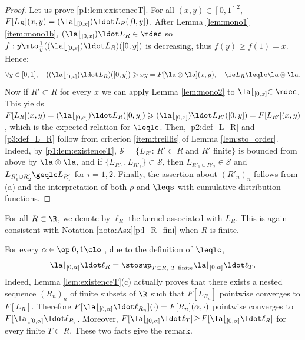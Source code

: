 \begin{proof} Let us prove \eqref{p1:lem:existenceT}. For all $(x,y)\in[0,1]^2$, $F[L_R](x,y)=(\la\lfloor_{[0,x]})\ldot L_R([0,y])$. After Lemma \ref{lem:mono1}\eqref{item:mono1b}, $(\la\lfloor_{[0,x]})\ldot L_R\in\mdec$ so $f:y\mto\frac1y((\la\lfloor_{[0,x]})\ldot L_R)([0,y])$ is decreasing, thus $f(y)\geq f(1)=x$. Hence:
\[
\forall y\in[0,1],\quad ((\la\lfloor_{[0,x]})\ldot L_R)([0,y])\geqslant xy=F[\la\otimes\la](x,y),\quad \text{\ie} L_R\leqlc \la\otimes\la.
\]
Now if $R'\subset R$ for every $x$ we can apply Lemma \ref{lem:mono2} to $\la\lfloor_{[0,x]}\in\mdec$. This yields $F[L_{R}](x,y)=(\la\lfloor_{[0,x]})\ldot L_{R}([0,y])\geqslant(\la\lfloor_{[0,x]})\ldot L_{R'}([0,y])=F[L_{R'}](x,y)$, which is the expected relation for $\leqlc$. Then, \eqref{p2:def_L_R} and \eqref{p3:def_L_R} follow from criterion \eqref{item:treillis} of Lemma \ref{lem:sto_order}. Indeed, by \eqref{p1:lem:existenceT}, $\mathcal{S}=\{L_{R'}:\,R'\subset R$ and $R'$ finite$\}$ is bounded from above by $\la\otimes\la$, and if $\{L_{R'_1},L_{R'_2}\}\subset\mathcal{S}$, then $L_{R'_1\cup R'_2}\in\mathcal{S}$ and $L_{R'_1\cup R'_2}\geqlc L_{R'_i}$ for $i=1,2$. Finally, the assertion about $(R'_n)_n$ follows from (a) and the interpretation of both $\rho$ and $\leqs$ with cumulative distribution functions.\end{proof}

\begin{notation}\label{nota:kernel_tS}For all $R\subset \R$, we denote by $\ell_R$ the kernel associated with $L_R$. This is again consistent with Notation \ref{nota:Asx}\eqref{p:l_R_fini} when $R$ is finite.
\end{notation}

\begin{rem}For every $\alpha\in \op]0,1\clo[$, due to the definition of $\leqlc$,
\[
\la\lfloor_{[0,\alpha]}{}\ldot\ell_R=\stosup_{T\subset R,\ T\text{ finite}} \la\lfloor_{[0,\alpha]}{}\ldot\ell_T.
\]
Indeed, Lemma \ref{lem:existenceT}(c) actually proves that there exists a nested sequence $(R_n)_n$ of finite subsets of $\R$ such that $F[L_{R_n}]$ pointwise converges to $F[L_R]$. Therefore $F[\la\lfloor_{[0,\alpha]}{}\ldot\nobreak\ell_{R_n}](\cdot)=F[R_n](\alpha,\cdot)$ pointwise converges to $F[\la\lfloor_{[0,\alpha]}{}\ldot\ell_{R}]$. Moreover, $F[\la\lfloor_{[0,\alpha]}{}\ldot\ell_{T}]\!\geq\!F[\la\lfloor_{[0,\alpha]}{}\ldot\ell_{R}]$ for every finite $T\!\subset\! R$. These two facts give the \hbox{remark}.
\end{rem}

